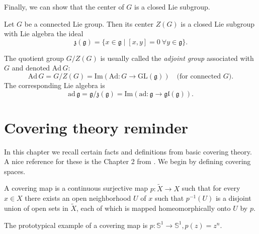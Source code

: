 \documentclass{report}
\begin{document}
Finally, we can show that the center of $G$ is a closed Lie subgroup.


\begin{theorem}
Let $G$ be a connected Lie group. Then its center $Z(G)$ is a closed Lie subgroup with Lie algebra the ideal 
\[
\mathfrak{z}(\mathfrak{g}) = \{ x \in \mathfrak{g} \mid [x, y] = 0 \ \forall y \in \mathfrak{g} \}.
\]
\end{theorem}

The quotient group $G / Z(G)$ is usually called the \textit{adjoint group} associated with $G$ and denoted $\text{Ad}\, G$:
\[
\text{Ad}\, G = G / Z(G) = \text{Im}(\text{Ad}: G \rightarrow \text{GL}(\mathfrak{g})) \quad \text{(for connected } G).
\]
The corresponding Lie algebra is
\[
\text{ad}\, \mathfrak{g} = \mathfrak{g} / \mathfrak{z}(\mathfrak{g}) = \text{Im}(\text{ad}: \mathfrak{g} \rightarrow \mathfrak{gl}(\mathfrak{g})).
\]
    
\appendix

\chapter{Covering theory reminder}
In this chapter we recall certain facts and definitions from basic covering theory.
A nice reference for these is the Chapter 2 from \cite{hatcher2002topology}.
We begin by defining covering spaces.
\begin{definition}
    A covering map is a continuous surjective map $p: \tilde X \to X$ such that for every $x \in X$ there exists an open neighborhood $U$ of $x$ such that $p^{-1}(U)$ is a disjoint union of open sets in $\tilde X$, each of which is mapped homeomorphically onto $U$ by $p$.
\end{definition}
The prototypical example of a covering map is $p: \mathbb S^1 \to \mathbb S^1, p(z) = z^n$.
\end{document}
